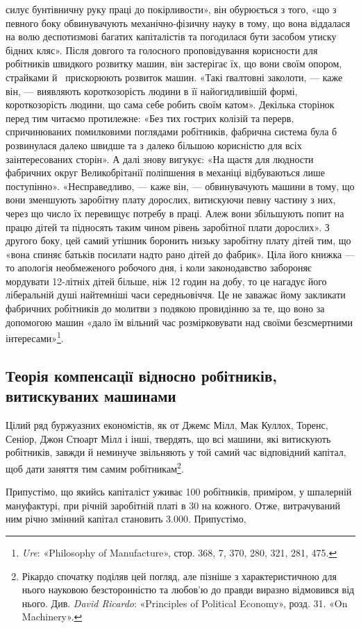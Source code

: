 \parcont{}  %
силує бунтівничну руку праці до покірливости», він обурюється
з того, «що з певного боку обвинувачують механічно-фізичну
науку в тому, що вона віддалася на волю деспотизмові багатих
капіталістів та погодилася бути засобом утиску бідних кляс».
Після довгого та голосного проповідування корисности для робітників
швидкого розвитку машин, він застерігає їх, що вони своїм
опором, страйками й~ прискорюють розвиток машин. «Такі
ґвалтовні заколоти, — каже він, — виявляють короткозорість людини
в її найогидливішій формі, короткозорість людини, що сама
себе робить своїм катом». Декілька сторінок перед тим читаємо
протилежне: «Без тих гострих колізій та перерв, спричинюваних
помилковими поглядами робітників, фабрична система була б
розвинулася далеко швидше та з далеко більшою корисністю
для всіх заінтересованих сторін». А далі знову вигукує: «На
щастя для людности фабричних округ Великобрітанії поліпшення
в механіці відбуваються лише поступінно». «Несправедливо, —
каже він, — обвинувачують машини в тому, що вони зменшують
заробітну плату дорослих, витискуючи певну частину з них, через
що число їх перевищує потребу в праці. Алеж вони збільшують
попит на працю дітей та підносять таким чином рівень заробітної
плати дорослих». З другого боку, цей самий утішник боронить
низьку заробітну плату дітей тим, що «вона спиняє батьків посилати
надто рано дітей до фабрик». Ціла його книжка — то апологія
необмеженого робочого дня, і коли законодавство забороняє
мордувати 12-літніх дітей більше, ніж 12 годин на добу, то це
нагадує його ліберальній душі найтемніші часи середньовіччя.
Це не заважає йому закликати фабричних робітників до молитви
з подякою провидінню за те, що воно за допомогою машин
«дало їм вільний час розмірковувати над своїми безсмертними
інтересами»\footnote{
\emph{Ure}: «Philosophy of Manufacture», стор. 368, 7, 370, 280, 321, 281, 475.
}.

\subsection{Теорія компенсації відносно робітників, витискуваних
машинами}

Цілий ряд буржуазних економістів, як от Джемс Мілл, Мак
Куллох, Торенс, Сеніор, Джон Стюарт Мілл і інші, твердять,
що всі машини, які витискують робітників, завжди й неминуче
звільняють у той самий час відповідний капітал, щоб дати заняття
тим самим робітникам\footnote{
Рікардо спочатку поділяв цей погляд, але пізніше з характеристичною
для нього науковою безсторонністю та любов’ю до правди виразно
відмовився від нього. Див. \emph{David Ricardo}: «Principles of Political
Economy», розд. 31. «On Machinery».
}.

Припустімо, що якийсь капіталіст уживає 100 робітників,
приміром, у шпалерній мануфактурі, при річній заробітній платі
в 30 на кожного. Отже, витрачуваний ним річно
змінний капітал становить \num{3.000}. Припустімо,
\parbreak{}  %
